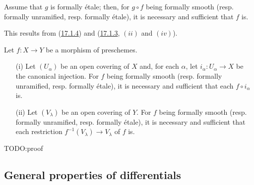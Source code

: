 \begin{corollary}[17.1.5]
\label{IV.17.1.5}
	Assume that $g$ is formally \'etale; then, for $g \circ f$ being formally smooth (resp. formally unramified, resp. formally \'etale), it is necessary and sufficient that $f$ is.
\end{corollary}	
This results from (\hyperref[IV.17.1.4]{17.1.4}) and (\hyperref[IV.17.1.3]{17.1.3}, $(ii)$ and $(iv)$).
\begin{proposition}[17.1.6]
\label{IV.17.1.6}
Let $f:X\to Y$ be a morphism of preschemes.
\begin{enumerate}
	\item[(i)] Let $(U_\alpha)$ be an open covering of $X$ and, for each $\alpha$, let $i_\alpha: U_\alpha \to X$ be the canonical injection. For $f$ being formally smooth (resp. formally unramified, resp. formally \'etale), it is necessary and sufficient that each $f \circ i_\alpha$ is.
	\item[(ii)] Let $(V_\lambda)$ be an open covering of $Y$. For $f$ being formally smooth (resp. formally unramified, resp. formally \'etale), it is necessary and sufficient that each restriction $f^{-1}(V_\lambda) \to V_\lambda$ of $f$ is.
\end{enumerate}
\end{proposition}	
TODO:proof

\subsection{General properties of differentials}
\label{subsection:IV.17.2}




